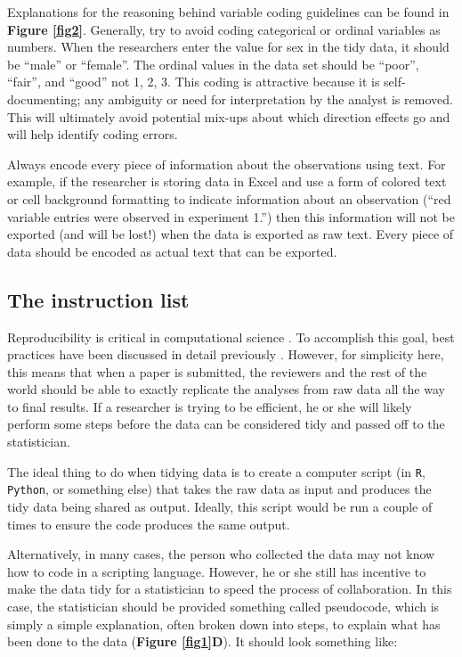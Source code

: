 \documentclass[12pt]{article}
\begin{document}
Explanations for the reasoning behind variable coding guidelines can be
found in \textbf{Figure \ref{fig2}}. Generally, try to avoid coding
categorical or ordinal variables as numbers. When the researchers enter
the value for sex in the tidy data, it should be ``male'' or ``female''.
The ordinal values in the data set should be ``poor'', ``fair'', and
``good'' not 1, 2, 3. This coding is attractive because it is
self-documenting; any ambiguity or need for interpretation by the
analyst is removed. This will ultimately avoid potential mix-ups about
which direction effects go and will help identify coding errors.

Always encode every piece of information about the observations using
text. For example, if the researcher is storing data in Excel and use a
form of colored text or cell background formatting to indicate
information about an observation (``red variable entries were observed
in experiment 1.'') then this information will not be exported (and will
be lost!) when the data is exported as raw text. Every piece of data
should be encoded as actual text that can be exported.

\subsection{The instruction list}\label{the-instruction-list}

Reproducibility is critical in computational science
\citep{peng_reproducible_2011}. To accomplish this goal, best practices
have been discussed in detail previously \citep{wilson_good_2017}.
However, for simplicity here, this means that when a paper is submitted,
the reviewers and the rest of the world should be able to exactly
replicate the analyses from raw data all the way to final results. If a
researcher is trying to be efficient, he or she will likely perform some
steps before the data can be considered tidy and passed off to the
statistician.

The ideal thing to do when tidying data is to create a computer script
(in \texttt{R}, \texttt{Python}, or something else) that takes the raw
data as input and produces the tidy data being shared as output.
Ideally, this script would be run a couple of times to ensure the code
produces the same output.

Alternatively, in many cases, the person who collected the data may not
know how to code in a scripting language. However, he or she still has
incentive to make the data tidy for a statistician to speed the process
of collaboration. In this case, the statistician should be provided
something called pseudocode, which is simply a simple explanation, often
broken down into steps, to explain what has been done to the data
(\textbf{Figure \ref{fig1}D}). It should look something like:
\end{document}
